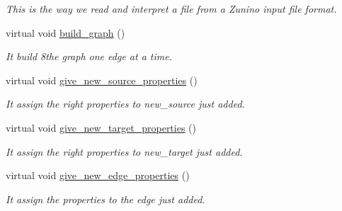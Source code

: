 \begin{DoxyCompactItemize}
\begin{DoxyCompactList}\small\item\em This is the way we read and interpret a file from a Zunino input file format. \item\end{DoxyCompactList}\item 
\hypertarget{classfinal_aa255f95f3c187ac566dc1160dde9db2f}{
virtual void \hyperlink{classfinal_aa255f95f3c187ac566dc1160dde9db2f}{build\_\-graph} ()}
\label{classfinal_aa255f95f3c187ac566dc1160dde9db2f}

\begin{DoxyCompactList}\small\item\em It build 8the graph one edge at a time. \item\end{DoxyCompactList}\item 
\hypertarget{classfinal_ae29bd829f7aad36aeb6f5dd406a4c46b}{
virtual void \hyperlink{classfinal_ae29bd829f7aad36aeb6f5dd406a4c46b}{give\_\-new\_\-source\_\-properties} ()}
\label{classfinal_ae29bd829f7aad36aeb6f5dd406a4c46b}

\begin{DoxyCompactList}\small\item\em It assign the right properties to new\_\-source just added. \item\end{DoxyCompactList}\item 
\hypertarget{classfinal_a97180567f0bdc0d6883e8f19bee5e3f3}{
virtual void \hyperlink{classfinal_a97180567f0bdc0d6883e8f19bee5e3f3}{give\_\-new\_\-target\_\-properties} ()}
\label{classfinal_a97180567f0bdc0d6883e8f19bee5e3f3}

\begin{DoxyCompactList}\small\item\em It assign the right properties to new\_\-target just added. \item\end{DoxyCompactList}\item 
\hypertarget{classfinal_af1ee4d51186fa9bc163acaf782587206}{
virtual void \hyperlink{classfinal_af1ee4d51186fa9bc163acaf782587206}{give\_\-new\_\-edge\_\-properties} ()}
\label{classfinal_af1ee4d51186fa9bc163acaf782587206}

\begin{DoxyCompactList}\small\item\em It assign the properties to the edge just added. \item\end{DoxyCompactList}\end{DoxyCompactItemize}
